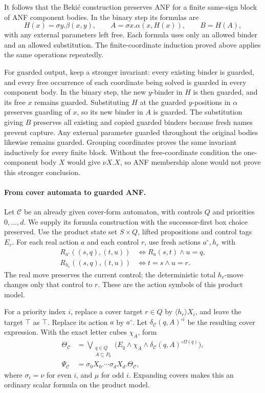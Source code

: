 It follows that the Beki\'c
construction preserves ANF for
a finite same-sign block of
ANF component bodies. In the
binary step its formulas are
\[
 H(x)=\sigma y.\beta(x,y),\qquad
 A=\sigma x.\alpha(x,H(x)),\qquad
 B=H(A),
\]
with any external parameters
left free. Each formula uses
only an allowed binder and
an allowed substitution.
The finite-coordinate induction
proved above applies the same
operations repeatedly.

For guarded output, keep a
stronger invariant: every
existing binder is guarded,
and every free occurrence
of each coordinate being
solved is guarded in every
component body.
In the binary step, the
new \(y\)-binder in \(H\)
is then guarded, and its
free \(x\) remains guarded.
Substituting \(H\) at the
guarded \(y\)-positions in
\(\alpha\) preserves guarding
of \(x\), so its new binder
in \(A\) is guarded.
The substitution giving \(B\)
preserves all existing and
copied guarded binders because
fresh names prevent capture.
Any external parameter guarded
throughout the original bodies
likewise remains guarded.
Grouping coordinates proves
the same invariant inductively
for every finite block.
Without the free-coordinate
condition the one-component
body \(X\) would give
\(\nu X.X\), so ANF membership
alone would not prove this
stronger conclusion.

\paragraph{From cover automata to guarded ANF.}
\label{sec:p09-mu-cover-to-anf}
Let \(\mathcal C\) be an
already given cover-form
automaton, with controls \(Q\)
and priorities \(0,\ldots,d\).
We supply its formula construction
with the successor-first box
choice preserved.
Use the product state set
\(S\times Q\), lifted propositions
and control tags \(E_r\).
For each real action \(a\)
and each control \(r\), use
fresh actions \(a^\circ,h_r\)
with
\[
\begin{aligned}
 R_{a^\circ}((s,q),(t,u))
     &\iff R_a(s,t)\land u=q,\\
 R_{h_r}((s,q),(t,u))
     &\iff t=s\land u=r.
\end{aligned}
\]
The real move preserves the
current control; the deterministic
total \(h_r\)-move changes only
that control to \(r\).
These are the action symbols
of this product model.

For a priority index \(i\),
replace a cover target \(r\in Q\)
by \(\langle h_r\rangle X_i\),
and leave the target \(\top\)
as \(\top\).
Replace its action \(a\) by
\(a^\circ\). Let
\(\delta_{\mathcal C}(q,A)^{\circ i}\)
be the resulting cover expression.
With the exact letter cubes
\(\chi_A\), form
\[
\begin{aligned}
 \Theta_{\mathcal C}
   &=\bigvee_{\substack{q\in Q\\A\subseteq P_0}}
       \bigl(E_q\land\chi_A\land
          \delta_{\mathcal C}(q,A)^{\circ\Omega(q)}\bigr),\\
 \Psi_{\mathcal C}
   &=\sigma_0X_0.\cdots\sigma_dX_d.\Theta_{\mathcal C},
\end{aligned}
\]
where \(\sigma_i=\nu\) for
even \(i\), and \(\mu\) for
odd \(i\).
Expanding covers makes this
an ordinary scalar formula
on the product model.

